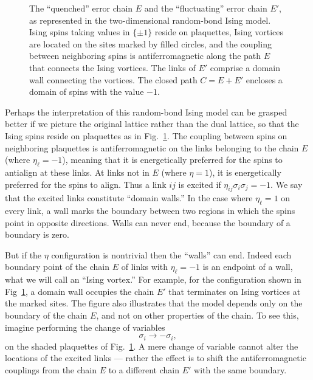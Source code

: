 \begin{figure}
\begin{center}
\leavevmode
\epsfxsize=3in
\end{center}
\caption{The ``quenched'' error chain $E$ and the ``fluctuating'' error chain $E'$, as represented in the two-dimensional random-bond Ising model. Ising spins taking values in $\{\pm 1\}$ reside on plaquettes, Ising vortices are located on the sites marked by filled circles, and the coupling between neighboring spins is antiferromagnetic along the path $E$ that connects the Ising vortices. The links of $E'$ comprise a domain wall connecting the vortices. The closed path $C=E+E'$ encloses a domain of spins with the value $-1$. }
\label{fig:ising_error}
\end{figure}

Perhaps the interpretation of this random-bond Ising model can be grasped better if we picture the original lattice rather than the dual lattice, so that the Ising spins reside on plaquettes as in Fig.~\ref{fig:ising_error}. The coupling between spins on neighboring plaquettes is antiferromagnetic on the links belonging to the chain $E$ (where $\eta_\ell=-1$), meaning that it is energetically preferred for the spins to antialign at these links. At links not in $E$ (where $\eta=1$), it is energetically preferred for the spins to align. Thus a link $ij$ is excited if $\eta_{ij} \sigma_i \sigma_j = - 1$.  We say that the excited links constitute ``domain walls.''  In the case where $\eta_\ell =1$ on every link, a wall marks the boundary between two regions in which the spins point in opposite directions.  Walls can never end, because the boundary of a boundary is zero.

But if the $\eta$ configuration is nontrivial then the ``walls'' can
end.  Indeed each boundary point of the chain $E$ of links with $\eta_\ell =
- 1$ is an endpoint of a wall, what we will call an ``Ising vortex.''  For example, for the configuration shown in Fig~\ref{fig:ising_error}, a domain wall occupies the chain $E'$ that terminates on Ising vortices at the marked sites. The figure also illustrates that the model depends only on the boundary of the chain $E$, and not on other properties of the chain.  To see this, imagine performing the change of variables
\begin{equation}
\sigma_i \rightarrow -\sigma_i,
\end{equation}
on the shaded plaquettes of Fig.~\ref{fig:ising_error}. A mere change of variable cannot alter the locations of the excited links --- rather the effect is to shift the antiferromagnetic couplings from the chain $E$ to a different chain $E'$ with the same boundary.

